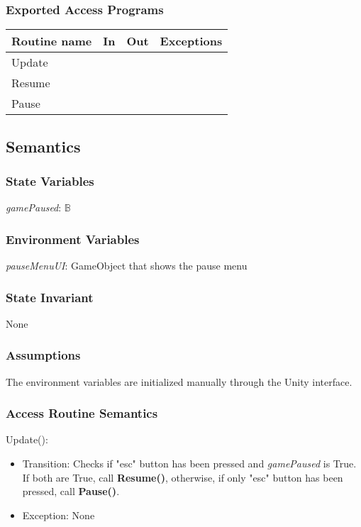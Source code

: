 \documentclass[12pt]{article}
\begin{document}
\subsubsection {Exported Access Programs}

\begin{tabular}{| l | l | l | l |}
\hline
\textbf{Routine name} & \textbf{In} & \textbf{Out} & \textbf{Exceptions}\\
\hline
Update & & & \\
\hline
Resume & & & \\
\hline
Pause & & & \\
\hline 
\end{tabular}

\subsection {Semantics}

\subsubsection {State Variables}
\textit{gamePaused}: $\mathbb{B}$ \\

\subsubsection {Environment Variables}
\textit{pauseMenuUI}: GameObject that shows the pause menu

\subsubsection {State Invariant}
None

\subsubsection {Assumptions}
The environment variables are initialized manually through the Unity interface.

\subsubsection {Access Routine Semantics}
Update():
\begin{itemize}
    \item Transition: Checks if "esc" button has been pressed and \textit{gamePaused} is True. If both are True, call \textbf{Resume()}, otherwise, if only "esc" button has been pressed, call \textbf{Pause()}.
    \item Exception: None
\end{itemize}
\end{document}

